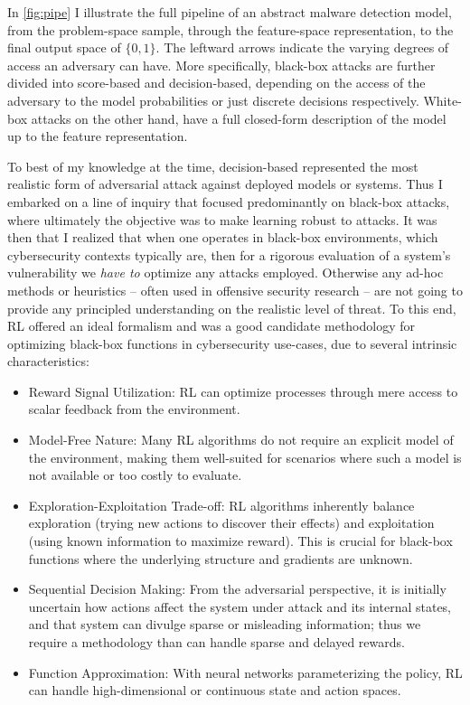 In \autoref{fig:pipe} I illustrate the full pipeline of an abstract malware detection model, from the problem-space sample, through the feature-space representation, to the final output space of $\{0,1\}$.
The leftward arrows indicate the varying degrees of access an adversary can have.
More specifically, black-box attacks are further divided into score-based and decision-based, depending on the access of the adversary to the model probabilities or just discrete decisions respectively.
White-box attacks on the other hand, have a full closed-form description of the model up to the feature representation.

To best of my knowledge at the time, decision-based represented the most realistic form of adversarial attack against deployed models or systems.
Thus I embarked on a line of inquiry that focused predominantly on black-box attacks, where ultimately the objective was to make learning robust to attacks.
It was then that I realized that when one operates in black-box environments, which cybersecurity contexts typically are, then for a rigorous evaluation of a system's vulnerability we \textit{have to} optimize any attacks employed.
Otherwise any ad-hoc methods or heuristics -- often used in offensive security research -- are not going to provide any principled understanding on the realistic level of threat.
To this end, \gls{RL} offered an ideal formalism and was a good candidate methodology for optimizing black-box functions in cybersecurity use-cases, due to several intrinsic characteristics:

\begin{itemize}
    \item Reward Signal Utilization: RL can optimize processes through mere access to scalar feedback from the environment.
    \item Model-Free Nature: Many RL algorithms do not require an explicit model of the environment, making them well-suited for scenarios where such a model is not available or too costly to evaluate.
    \item Exploration-Exploitation Trade-off: RL algorithms inherently balance exploration (trying new actions to discover their effects) and exploitation (using known information to maximize reward). This is crucial for black-box functions where the underlying structure and gradients are unknown.
    \item Sequential Decision Making: From the adversarial perspective, it is initially uncertain how actions affect the system under attack and its internal states, and that system can divulge sparse or misleading information; thus we require a methodology than can handle sparse and delayed rewards.
    \item Function Approximation: With neural networks parameterizing the policy, RL can handle high-dimensional or continuous state and action spaces.
\end{itemize}

